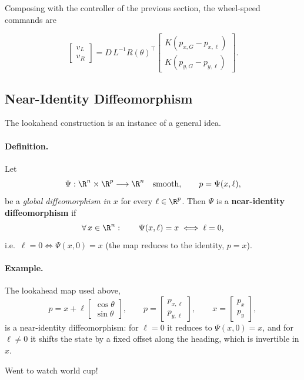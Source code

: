 \documentclass[../../master-handout.tex]{subfiles}
\begin{document}
Composing with the controller of the previous section, the wheel-speed commands
are
\begin{fullwidth}
\begin{equation}
    \boxed{\;
    \begin{bmatrix} v_L \\ v_R \end{bmatrix}
    = D \, L^{-1} R(\theta)^\top
    \begin{bmatrix}
        K \left(p_{x,G} - p_{x,\ell}\right) \\
        K \left(p_{y,G} - p_{y,\ell}\right)
    \end{bmatrix}. \;}
\end{equation}
\end{fullwidth}

\subsection{Near-Identity Diffeomorphism}

The lookahead construction is an instance of a general idea.

\paragraph{Definition.}
Let
\begin{equation}
    \Psi : \R^n \times \R^p \longrightarrow \R^n \quad \text{smooth}, \qquad
    p = \Psi(x, \ell),
\end{equation}
be a \emph{global diffeomorphism in $x$} for every $\ell \in \R^p$. Then $\Psi$
is a \textbf{near-identity diffeomorphism} if
\begin{equation}
    \forall\, x \in \R^n: \qquad \Psi(x, \ell) = x \iff \ell = 0,
\end{equation}
i.e.\ $\ell = 0 \iff \Psi(x, 0) = x$ (the map reduces to the identity, $p = x$).

\paragraph{Example.}
The lookahead map used above,
\begin{equation}
    p = x + \ell \begin{bmatrix} \cos\theta \\ \sin\theta \end{bmatrix},
    \qquad
    p = \begin{bmatrix} p_{x,\ell} \\ p_{y,\ell} \end{bmatrix},
    \qquad
    x = \begin{bmatrix} p_x \\ p_y \end{bmatrix},
\end{equation}
is a near-identity diffeomorphism: for $\ell = 0$ it reduces to
$\Psi(x, 0) = x$, and for $\ell \neq 0$ it shifts the state by a fixed offset
along the heading, which is invertible in $x$.

Went to watch world cup!
\end{document}
